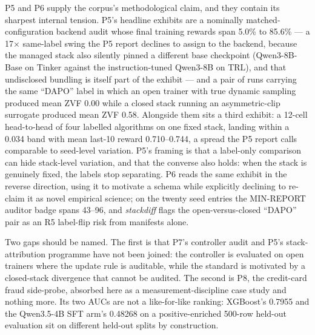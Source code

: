 \documentclass[12pt,a4paper]{report}
\begin{document}
P5 and P6 supply the corpus's methodological claim, and they contain its
sharpest internal tension. P5's headline exhibits are a nominally
matched-configuration backend audit whose final training rewards span
5.0\% to 85.6\% --- a 17× same-label swing the P5 report declines to
assign to the backend, because the managed stack also silently pinned a
different base checkpoint (Qwen3-8B-Base on Tinker against the
instruction-tuned Qwen3-8B on TRL), and that undisclosed bundling is
itself part of the exhibit --- and a pair of runs carrying the same
``DAPO'' label in which an open trainer with true dynamic sampling
produced mean ZVF 0.00 while a closed stack running an asymmetric-clip
surrogate produced mean ZVF 0.58. Alongside them sits a third exhibit: a
12-cell head-to-head of four labelled algorithms on one fixed stack,
landing within a 0.034 band with mean last-10 reward 0.710--0.744, a
spread the P5 report calls comparable to seed-level variation. P5's
framing is that a label-only comparison can hide stack-level variation,
and that the converse also holds: when the stack is genuinely fixed, the
labels stop separating. P6 reads the same exhibit in the reverse
direction, using it to motivate a schema while explicitly declining to
re-claim it as novel empirical science; on the twenty seed entries the
MIN-REPORT auditor badge spans 43--96, and \emph{stackdiff} flags the
open-versus-closed ``DAPO'' pair as an R5 label-flip risk from manifests
alone.

Two gaps should be named. The first is that P7's controller audit and
P5's stack-attribution programme have not been joined: the controller is
evaluated on open trainers where the update rule is auditable, while the
standard is motivated by a closed-stack divergence that cannot be
audited. The second is P8, the credit-card fraud side-probe, absorbed
here as a measurement-discipline case study and nothing more. Its two
AUCs are not a like-for-like ranking: XGBoost's 0.7955 and the
Qwen3.5-4B SFT arm's 0.48268 on a positive-enriched 500-row held-out
evaluation sit on different held-out splits by construction.
\end{document}
